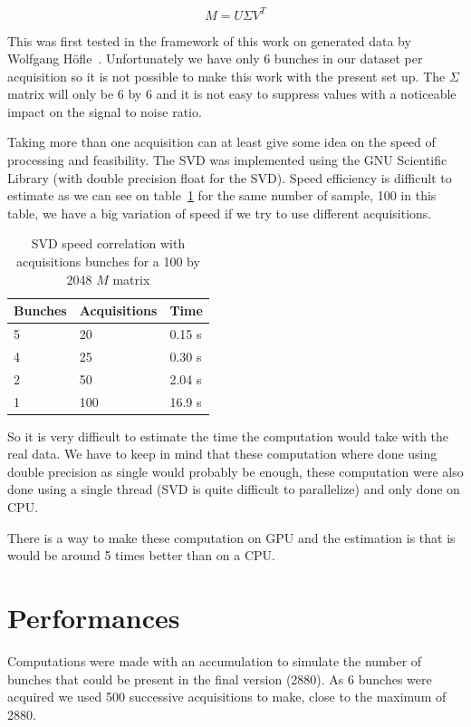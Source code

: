 $$M = U \Sigma V^{T}$$ 

This was first tested in the framework of this work on generated data by Wolfgang H{\"o}f\/le~\cite{HofleEvian10}. Unfortunately we have only 6 bunches in our dataset per acquisition so it is not possible to make this work with the present set up. The $\Sigma$ matrix will only be 6 by 6 and it is not easy to suppress values with a noticeable impact on the signal to noise ratio.

Taking more than one acquisition can at least give some idea on the speed of processing and feasibility. The SVD was implemented using the GNU Scientific Library (with double precision float for the SVD). Speed efficiency is difficult to estimate as we can see on table~\ref{tab:SVD} for the same number of sample, 100 in this table, we have a big variation of speed if we try to use different acquisitions.

\begin{table}[H]
\caption{SVD speed correlation with acquisitions bunches for a 100 by 2048 $M$ matrix}
\label{tab:SVD}
\centering
\begin{tabular}{|l|l|l|}
\hline
Bunches & Acquisitions & Time \\
\hline
5 & 20 & 0.15 s \\
4 & 25 & 0.30 s \\
2 & 50 & 2.04 s \\
1 & 100 & 16.9 s \\
\hline
\end{tabular}
\end{table}

So it is very difficult to estimate the time the computation would take with the real data. We have to keep in mind that these computation where done using double precision as single would probably be enough, these computation were also done using a single thread (SVD is quite difficult to parallelize) and only done on \gls{CPU}.

There is a way to make these computation on \gls{GPU}\cite{Lahabar09} and the estimation is that is would be around 5 times better than on a \gls{CPU}.

\section{Performances}
\label{sec:perf}

Computations were made with an accumulation to simulate the number of bunches that could be present in the final version (2880). As 6 bunches were acquired we used 500 successive acquisitions to make, close to the maximum of 2880.

